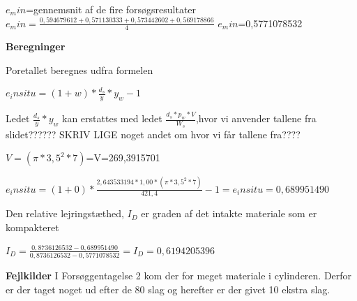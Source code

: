 $e_min$=gennemsnit af de fire forsøgsresultater
$e_min=\frac{0,594679612+0,571130333+0,573442602+0,569178866}{4}$
$e_min$=0,5771078532

\textbf{Beregninger}
\newline

Poretallet beregnes udfra formelen
\begin{center}
	$e_insitu=(1+w)*\frac{d_s}{y}*y_w-1$
\end{center}

Ledet $\frac{d_s}{y}*y_w$ kan erstattes med ledet $\frac{d_s*p_w*V}{W_s}$,hvor vi anvender tallene fra slidet?????? SKRIV LIGE noget andet om hvor vi får tallene fra????
\begin{center}
	$V=(\pi*3,5^2*7)$=V=269,3915701
\end{center}
\begin{center}
	$e_insitu=(1+0)*\frac{2,643533194*1,00*(\pi*3,5^2*7)}{421,4}-1=e_insitu=0,689951490$
\end{center}

Den relative lejringstæthed, $I_D$ er graden af det intakte materiale som er kompakteret
\begin{center}
	$I_D=\frac{0,8736126532-0,689951490}{0,8736126532-0,5771078532}=I_D=0,6194205396$
\end{center}

\begin{figure}
	\begin{center}
		
	\end{center}
\end{figure}

\textbf{Fejlkilder}
I Forsøggentagelse 2 kom der for meget materiale i cylinderen. Derfor er der taget noget ud efter de 80 slag og herefter er der givet 10 ekstra slag. 

